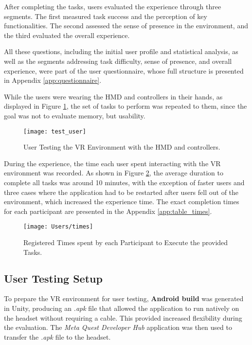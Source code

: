 After completing the tasks, users evaluated the experience through three segments. The first measured task success and the perception of key functionalities. 
The second assessed the sense of presence in the environment, and the third evaluated the overall experience. 

All these questions, including the initial user profile and statistical analysis, as well as the segments addressing task difficulty, sense of presence, and overall experience, were part of the user questionnaire, whose full structure is presented in Appendix \ref{app:questionnaire}.

While the users were wearing the \gls{HMD} and controllers in their hands, as displayed in Figure \ref{fig:user}, the set of tasks to perform was repeated to them, since the goal was not to evaluate memory, but usability.

\begin{figure}[h!]
    \centering
    \texttt{[image: test\_user]}
    \caption{User Testing the \gls{VR} Environment with the \gls{HMD} and controllers.} 
    \label{fig:user}
\end{figure}

During the experience, the time each user spent interacting with the \gls{VR} environment was recorded.
As shown in Figure \ref{fig:times}, the average duration to complete all tasks was around 10 minutes, with the exception of faster users and three cases where the application had to be restarted after users fell out of the environment, which increased the experience time.
The exact completion times for each participant are presented in the Appendix \ref{app:table_times}.

\begin{figure}[h!]
    \centering
    \texttt{[image: Users/times]}
    \caption{Registered Times spent by each Participant to Execute the provided Tasks.} 
    \label{fig:times}
\end{figure}

\subsection{User Testing Setup}
\label{sec:setup}
To prepare the \gls{VR} environment for user testing, \textbf{Android build} was generated in Unity, producing an \emph{.apk} file that allowed the application to run natively on the headset without requiring a cable. 
This provided increased flexibility during the evaluation. 
The \emph{Meta Quest Developer Hub} application was then used to transfer the \emph{.apk} file to the headset.

